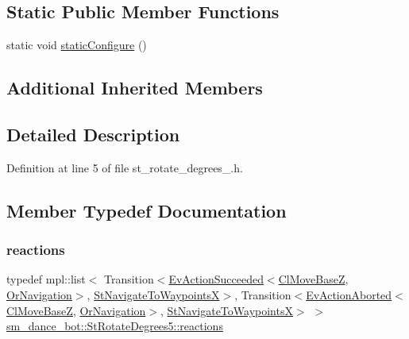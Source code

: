 \subsection*{Static Public Member Functions}
\begin{DoxyCompactItemize}
\item 
static void \hyperlink{structsm__dance__bot_1_1StRotateDegrees5_a60fd6ec21fe69a27245785e83b610b57}{static\+Configure} ()
\end{DoxyCompactItemize}
\subsection*{Additional Inherited Members}


\subsection{Detailed Description}


Definition at line 5 of file st\+\_\+rotate\+\_\+degrees\+\_.\+h.



\subsection{Member Typedef Documentation}
\mbox{\label{structsm__dance__bot_1_1StRotateDegrees5_a4a656e380d1f371b16d3daf9361cdf23}} 
\subsubsection{\texorpdfstring{reactions}{reactions}}
{\footnotesize\ttfamily typedef mpl\+::list$<$ Transition$<$\hyperlink{structsmacc_1_1default__events_1_1EvActionSucceeded}{Ev\+Action\+Succeeded}$<$\hyperlink{classcl__move__base__z_1_1ClMoveBaseZ}{Cl\+Move\+BaseZ}, \hyperlink{classsm__dance__bot_1_1OrNavigation}{Or\+Navigation}$>$, \hyperlink{structsm__dance__bot_1_1StNavigateToWaypointsX}{St\+Navigate\+To\+WaypointsX}$>$, Transition$<$\hyperlink{structsmacc_1_1default__events_1_1EvActionAborted}{Ev\+Action\+Aborted}$<$\hyperlink{classcl__move__base__z_1_1ClMoveBaseZ}{Cl\+Move\+BaseZ}, \hyperlink{classsm__dance__bot_1_1OrNavigation}{Or\+Navigation}$>$, \hyperlink{structsm__dance__bot_1_1StNavigateToWaypointsX}{St\+Navigate\+To\+WaypointsX}$>$ $>$ \hyperlink{structsm__dance__bot_1_1StRotateDegrees5_a4a656e380d1f371b16d3daf9361cdf23}{sm\+\_\+dance\+\_\+bot\+::\+St\+Rotate\+Degrees5\+::reactions}}



